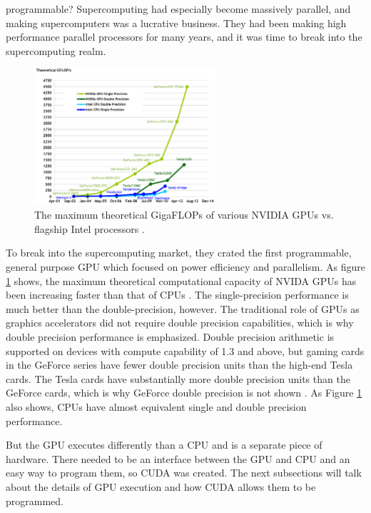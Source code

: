 programmable?  Supercomputing had especially become massively parallel, and making supercomputers was a lucrative business.  They had been making high performance parallel processors for many years, and it was time to break into the supercomputing realm.

\begin{figure}[h!] 
  \centering
    \includegraphics[width=0.6\textwidth]{graphics/computational_cap.pdf}
     \caption[The maximum theoretical GigaFLOPs of various NVIDIA GPUs vs. flagship Intel processors.]{The maximum theoretical GigaFLOPs of various NVIDIA GPUs vs. flagship Intel processors \cite{cuda}. \label{computational_cap}}
\end{figure}

To break into the supercomputing market, they crated the first programmable, general purpose GPU which focused on power efficiency and parallelism.  As figure \ref{computational_cap} shows, the maximum theoretical computational capacity of NVIDA GPUs has been increasing faster than that of CPUs \cite{cuda}.  The single-precision performance is much better than the double-precision, however.  The traditional role of GPUs as graphics accelerators did not require double precision capabilities, which is why double precision performance is emphasized.  Double precision arithmetic is supported on devices with compute capability of 1.3 and above, but gaming cards in the GeForce series have fewer double precision units than the high-end Tesla cards.  The Tesla cards have substantially more double precision units than the GeForce cards, which is why GeForce double precision is not shown \cite{fermi}.  As Figure \ref{computational_cap} also shows, CPUs have almost equivalent single and double precision performance. 

But the GPU executes differently than a CPU and is a separate piece of hardware.  There needed to be an interface between the GPU and CPU and an easy way to program them, so CUDA was created.  The next subsections will talk about the details of GPU execution and how CUDA allows them to be programmed. 

